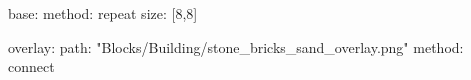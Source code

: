 base:
  method: repeat
  size: [8,8]

overlay:
  path: "Blocks/Building/stone_bricks_sand_overlay.png"
  method: connect